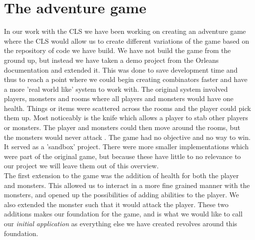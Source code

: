\section{The adventure game}
In our work with the CLS we have been working on creating an adventure game where the CLS would allow us to create different variations of the game based on the repository of code we have build. We have not build the game from the ground up, but instead we have taken a demo project from the Orleans documentation \cite{AdventureGame} and extended it. This was done to save development time and thus to reach a point where we could begin creating combinators faster and have a more 'real world like' system to work with. The original system involved players, monsters and rooms where all players and monsters would have one health. Things or items were scattered across the rooms and the player could pick them up. Most noticeably is the knife which allows a player to stab other players or monsters. The player and monsters could then move around the rooms, but the monsters would never attack . The game had no objective and no way to win. It served as a 'sandbox' project. There were more smaller implementations which were part of the original game, but because these have little to no relevance to our project we will leave them out of this overview.\\
The first extension to the game was the addition of health for both the player and monsters. This allowed us to interact in a more fine grained manner with the monsters, and opened up the possibilities of adding abilities to the player. We also extended the monster such that it would attack the player. These two additions makes our foundation for the game, and is what we would like to call our \textit{initial application} as everything else we have created revolves around this foundation.\\

